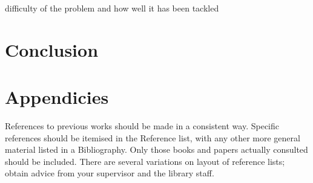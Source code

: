 \documentclass[a4paper,12pt]{article}
\begin{document}
difficulty of the problem and how well it has been tackled\\

\cite{liuLiquidMetalMachine2016}

\newpage

\section{Conclusion}

\newpage

\section{Appendicies}

\newpage
References to previous works should be made in a consistent way. Specific references should be itemised in the Reference list, with any other more general material listed in a Bibliography. Only those books and papers actually consulted should be included. There are several variations on layout of reference lists; obtain advice from your supervisor and the library staff.  

\printbibliography
	
\end{document}
